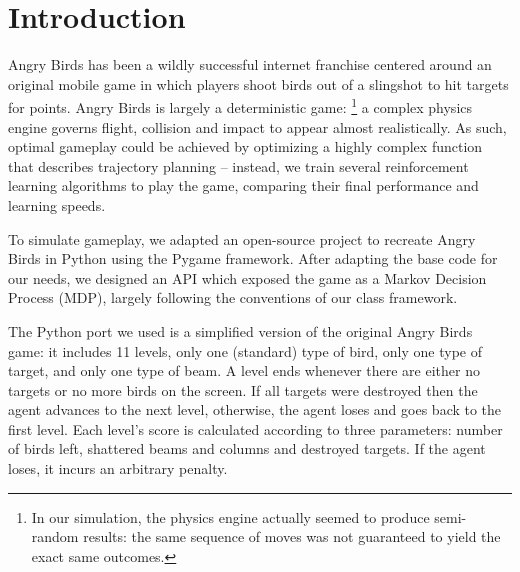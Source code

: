 \documentclass[fleqn,10pt]{SelfArx} %
\affiliation{\textsuperscript{1}\textit{Department of Management Science and Engineering, Stanford University, California,  United States}} %
\begin{document}
\flushbottom %

\maketitle %

\tableofcontents %

\thispagestyle{empty} %


\section*{Introduction} %


Angry Birds has been a wildly successful internet franchise centered around an original mobile game in which players shoot birds out of a slingshot to hit targets for points. Angry Birds is largely a deterministic game: %
\footnote{In our simulation, the physics engine actually seemed to produce semi-random results: the same sequence of moves was not guaranteed to yield the exact same outcomes.} %
a complex physics engine governs flight, collision and impact to appear almost realistically. As such, optimal gameplay could be achieved by optimizing a highly complex function that describes trajectory planning -- instead, we train several reinforcement learning algorithms to play the game, comparing their final performance and learning speeds.

To simulate gameplay, we adapted an open-source project to recreate Angry Birds in Python \cite{estevaofon} using the Pygame framework. After adapting the base code for our needs, we designed an API which exposed the game as a Markov Decision Process (MDP), largely following the conventions of our class framework.

The Python port we used is a simplified version of the original Angry Birds game: it includes 11 levels, only one (standard) type of bird, only one type of target, and only one type of beam. A level ends whenever there are either no targets or no more birds on the screen. If all targets were destroyed then the agent advances to the next level, otherwise, the agent loses and goes back to the first level. Each level’s score is calculated according to three parameters: number of birds left, shattered beams and columns and destroyed targets. If the agent loses, it incurs an arbitrary penalty. 
\end{document}
